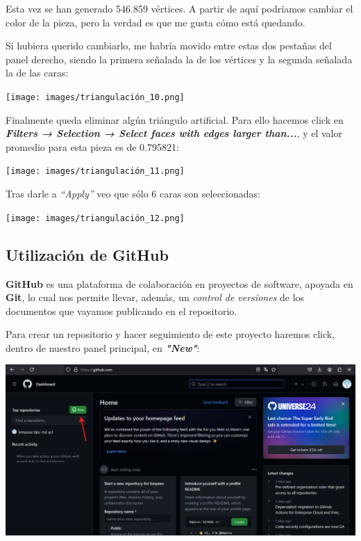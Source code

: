 \documentclass[options]{article}
\begin{document}
Esta vez se han generado 546.859 vértices. A partir de aquí podríamos cambiar el color de la pieza, pero la verdad es que me gusta cómo está quedando. 

\pagebreak

Si hubiera querido cambiarlo, me habría movido entre estas dos pestañas del panel derecho, siendo la primera señalada la de los vértices y la segunda señalada la de las caras:

\begin{center}
    \texttt{[image: images/triangulación\_10.png]}    
\end{center}

Finalmente queda eliminar algún triángulo artificial. Para ello hacemos click en \textbf{\textit{Filters → Selection → Select faces with edges larger than...}}, y el valor promedio para esta pieza es de 0.795821:

\begin{center}
    \texttt{[image: images/triangulación\_11.png]}    
\end{center}

Tras darle a \textit{``Apply''} veo que sólo 6 caras son seleccionadas:

\begin{center}
    \texttt{[image: images/triangulación\_12.png]}    
\end{center}

\subsection{Utilización de GitHub}

\textbf{GitHub} es una plataforma de colaboración en proyectos de software, apoyada en \textbf{Git}, lo cual nos permite llevar, además, un \textit{control de versiones} de los documentos que vayamos publicando en el repositorio. 


Para crear un repositorio y hacer seguimiento de este proyecto haremos click, dentro de nuestro panel principal, en \textbf{\textit{"New"}}:

\begin{center}
    \includegraphics[scale=0.35]{images/github_01.png}
\end{center}
\end{document}

